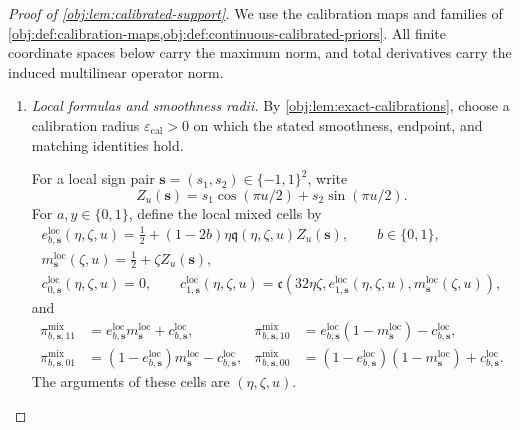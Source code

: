 \begin{proof}[Proof of \cref{obj:lem:calibrated-support}]
We use the calibration maps and families of
\cref{obj:def:calibration-maps,obj:def:continuous-calibrated-priors}.
All finite coordinate spaces below carry the maximum norm, and total derivatives carry the induced multilinear operator norm.

\begin{enumerate}
\item \textit{Local formulas and smoothness radii.}
By \cref{obj:lem:exact-calibrations}, choose a calibration radius
\(\varepsilon_{\mathrm{cal}}>0\) on which the stated smoothness, endpoint, and matching identities hold.

For a local sign pair \(\mathbf s=(s_1,s_2)\in\{-1,1\}^2\), write
\[
Z_u(\mathbf s)
=s_1\cos(\pi u/2)+s_2\sin(\pi u/2).
\]
For \(a,y\in\{0,1\}\), define the local mixed cells by
\[
\begin{gathered}
e^{\mathrm{loc}}_{b,\mathbf s}(\eta,\zeta,u)
=\frac12+(1-2b)\eta\mathfrak q(\eta,\zeta,u)Z_u(\mathbf s),
\qquad b\in\{0,1\},\\
m^{\mathrm{loc}}_{\mathbf s}(\zeta,u)
=\frac12+\zeta Z_u(\mathbf s),\\
c^{\mathrm{loc}}_{0,\mathbf s}(\eta,\zeta,u)=0,\qquad
c^{\mathrm{loc}}_{1,\mathbf s}(\eta,\zeta,u)
=\mathfrak c\!\left(
32\eta\zeta,e^{\mathrm{loc}}_{1,\mathbf s}(\eta,\zeta,u),
m^{\mathrm{loc}}_{\mathbf s}(\zeta,u)\right),
\end{gathered}
\]
and
\[
\begin{aligned}
\pi^{\mathrm{mix}}_{b,\mathbf s,11}
&=e^{\mathrm{loc}}_{b,\mathbf s}m^{\mathrm{loc}}_{\mathbf s}
  +c^{\mathrm{loc}}_{b,\mathbf s},&
\pi^{\mathrm{mix}}_{b,\mathbf s,10}
&=e^{\mathrm{loc}}_{b,\mathbf s}(1-m^{\mathrm{loc}}_{\mathbf s})
  -c^{\mathrm{loc}}_{b,\mathbf s},\\
\pi^{\mathrm{mix}}_{b,\mathbf s,01}
&=(1-e^{\mathrm{loc}}_{b,\mathbf s})m^{\mathrm{loc}}_{\mathbf s}
  -c^{\mathrm{loc}}_{b,\mathbf s},&
\pi^{\mathrm{mix}}_{b,\mathbf s,00}
&=(1-e^{\mathrm{loc}}_{b,\mathbf s})(1-m^{\mathrm{loc}}_{\mathbf s})
  +c^{\mathrm{loc}}_{b,\mathbf s}.
\end{aligned}
\]
The arguments of these cells are \((\eta,\zeta,u)\).


\end{enumerate}
\end{proof}
